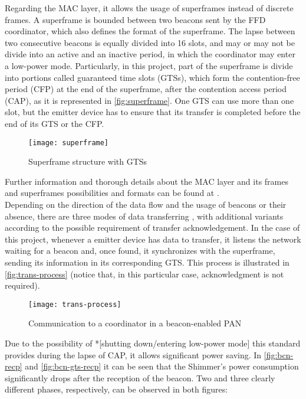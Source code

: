 			Regarding the MAC layer, it allows the usage of superframes instead of discrete frames. A superframe
			is bounded between two beacons sent by the FFD coordinator, which also defines the format of the
			superframe. The lapse between two consecutive beacons is equally divided into 16 slots, and may or may
			not be divide into an active and an inactive period, in which the coordinator may enter a low-power
			mode. Particularly, in this project, part of the superframe is divide into portions called guaranteed
			time slots (GTSs), which form the contention-free period (CFP) at the end of the superframe, after
			the contention access period (CAP), as it is represented in \autoref{fig:superframe}. One GTS can use
			more than one slot, but the emitter device has to ensure that its transfer is completed before the
			end of its GTS or the CFP.

			\begin{figure}[h]
				\texttt{[image: superframe]}
				\centering
				\caption{Superframe structure with GTSs}
				\label{fig:superframe}
			\end{figure}

			Further information and thorough details about the MAC layer and its frames and superframes
			possibilities and formats can be found at \cite[p. 67]{802.15.4}.\\

			Depending on the direction of the data flow and the usage of beacons or their absence, there
			are three modes of data transferring \cite[p. 18]{802.15.4}, with additional variants according to
			the possible requirement of transfer acknowledgement. In the case of this project, whenever a emitter
			device has data to transfer, it listens the network waiting for a beacon and, once found, it
			synchronizes with the superframe, sending its information in its corresponding GTS. This process is
			illustrated in \autoref{fig:trans-process} (notice that, in this particular case, acknowledgment is
			not required). 

			\begin{figure}[h]
				\texttt{[image: trans-process]}
				\centering
				\caption{Communication to a coordinator in a beacon-enabled PAN}
				\label{fig:trans-process}
			\end{figure}

			Due to the possibility of *[shutting down/entering low-power mode] this standard provides during the
			lapse of CAP, it allows significant power saving. In \autoref{fig:bcn-recp} and 
			\autoref{fig:bcn-gts-recp} it can be seen that the Shimmer's power consumption significantly drops
			after the reception of the beacon. Two and three clearly different phases, respectively, can be
			observed in both figures:

